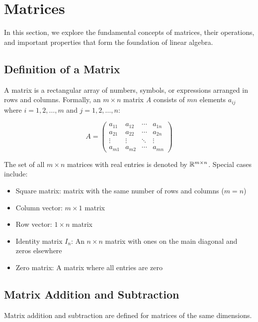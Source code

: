 \newpage
\section{Matrices}

In this section, we explore the fundamental concepts of matrices, their operations, and important properties that form the foundation of linear algebra.

\subsection{Definition of a Matrix}

A matrix is a rectangular array of numbers, symbols, or expressions arranged in rows and columns. Formally, an \(m \times n\) matrix \emph{A} consists of \(mn\) elements \(a_{ij}\) where \(i = 1, 2, \ldots, m\) and \(j = 1, 2, \ldots, n\):

\[
    A = 
    \begin{pmatrix}
    a_{11} & a_{12} & \cdots & a_{1n} \\
    a_{21} & a_{22} & \cdots & a_{2n} \\
    \vdots & \vdots & \ddots & \vdots \\
    a_{m1} & a_{m2} & \cdots & a_{mn}
    \end{pmatrix}
\]

The set of all \(m \times n\) matrices with real entries is denoted by \(\mathbb{R}^{m \times n}\). Special cases include:

\begin{itemize}
    \item Square matrix: matrix with the same number of rows and columns (\(m = n\))
    \item Column vector: \(m \times 1\) matrix
    \item Row vector: \(1 \times n\) matrix
    \item Identity matrix \(I_n\): An \(n \times n\) matrix with ones on the main diagonal and zeros elsewhere
    \item Zero matrix: A matrix where all entries are zero
\end{itemize}

\subsection{Matrix Addition and Subtraction}

Matrix addition and subtraction are defined for matrices of the same dimensions.

